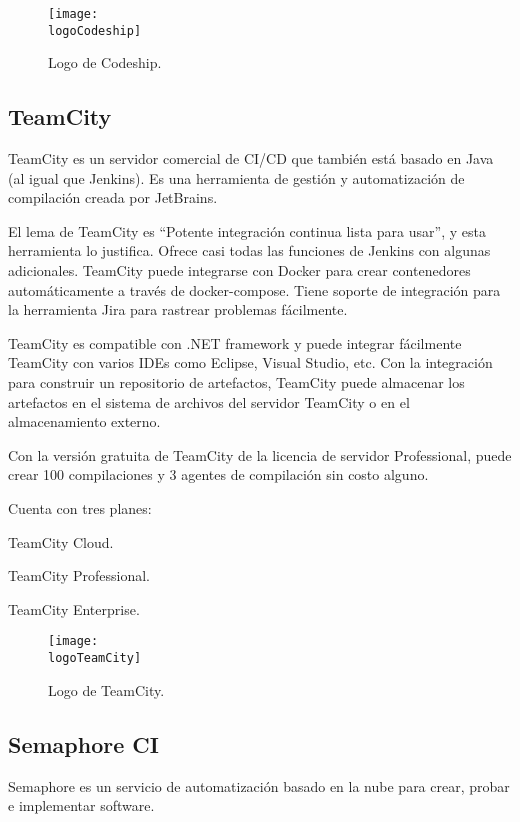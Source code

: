 \begin{figure}[h]
    \centering
    \texttt{[image: \\logoCodeship]}
    \caption{Logo de Codeship.}
\end{figure}

\subsection{TeamCity}
TeamCity es un servidor comercial de CI/CD que también está basado en Java (al igual que Jenkins). Es una herramienta de gestión y automatización de compilación creada por JetBrains.

El lema de TeamCity es “Potente integración continua lista para usar”, y esta herramienta lo justifica. Ofrece casi todas las funciones de Jenkins con algunas adicionales. TeamCity puede integrarse con Docker para crear contenedores automáticamente a través de docker-compose. Tiene soporte de integración para la herramienta Jira para rastrear problemas fácilmente.

TeamCity es compatible con .NET framework y puede integrar fácilmente TeamCity con varios IDEs como Eclipse, Visual Studio, etc. Con la integración para construir un repositorio de artefactos, TeamCity puede almacenar los artefactos en el sistema de archivos del servidor TeamCity o en el almacenamiento externo.

Con la versión gratuita de TeamCity de la licencia de servidor Professional, puede crear 100 compilaciones y 3 agentes de compilación sin costo alguno.

Cuenta con tres planes:
\begin{compactitem}
    \item TeamCity Cloud.
    \item TeamCity Professional.
    \item TeamCity Enterprise.
\end{compactitem}

\begin{figure}[h]
    \centering
    \texttt{[image: \\logoTeamCity]}
    \caption{Logo de TeamCity.}
\end{figure}

\subsection{Semaphore CI}
Semaphore es un servicio de automatización basado en la nube para crear, probar e implementar software.


